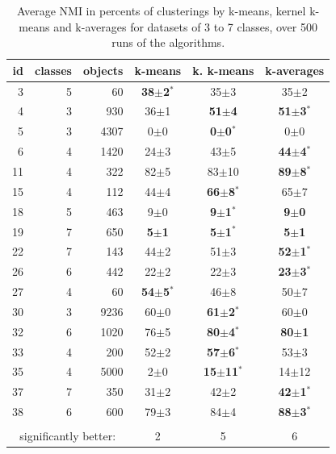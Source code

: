 \documentclass[10pt,journal,compsoc]{IEEEtran}
\begin{document}
   
\begin{table} 
\begin{center} 
\caption{Average NMI in percents of clusterings by k-means, kernel k-means and k-averages for datasets of 3 to 7 classes, over 500 runs of the algorithms.}
\label{tab:results-37}
\begin{tabular}{rrrccc} 
id & classes & objects & k-means & k. k-means & k-averages \\ 
\hline 
 3 & 5 &   60 & \textbf{38$\pm$2$^*$} & 35$\pm$3 & 35$\pm$2 \\ 
 4 & 3 &  930 & 36$\pm$1 & \textbf{51$\pm$4} & \textbf{51$\pm$3$^*$} \\ 
 5 & 3 & 4307 & 0$\pm$0 & \textbf{0$\pm$0$^*$} & 0$\pm$0 \\ 
 6 & 4 & 1420 & 24$\pm$3 & 43$\pm$5 & \textbf{44$\pm$4$^*$} \\ 
11 & 4 &  322 &  82$\pm$5 & 83$\pm$10 & \textbf{ 89$\pm$8$^*$} \\ 
15 & 4 &  112 & 44$\pm$4 & \textbf{66$\pm$8$^*$} & 65$\pm$7 \\ 
18 & 5 &  463 & 9$\pm$0 & \textbf{9$\pm$1$^*$} & \textbf{9$\pm$0} \\ 
19 & 7 &  650 & \textbf{5$\pm$1} & \textbf{5$\pm$1$^*$} & \textbf{5$\pm$1} \\ 
22 & 7 &  143 & 44$\pm$2 & 51$\pm$3 & \textbf{52$\pm$1$^*$} \\ 
26 & 6 &  442 & 22$\pm$2 & 22$\pm$3 & \textbf{23$\pm$3$^*$} \\ 
27 & 4 &   60 & \textbf{54$\pm$5$^*$} & 46$\pm$8 & 50$\pm$7 \\ 
30 & 3 & 9236 & 60$\pm$0 & \textbf{61$\pm$2$^*$} & 60$\pm$0 \\ 
32 & 6 & 1020 & 76$\pm$5 & \textbf{80$\pm$4$^*$} & \textbf{80$\pm$1} \\ 
33 & 4 &  200 & 52$\pm$2 & \textbf{57$\pm$6$^*$} & 53$\pm$3 \\ 
35 & 4 & 5000 &   2$\pm$0 & \textbf{15$\pm$11$^*$} & 14$\pm$12 \\ 
37 & 7 &  350 & 31$\pm$2 & 42$\pm$2 & \textbf{42$\pm$1$^*$} \\ 
38 & 6 &  600 & 79$\pm$3 & 84$\pm$4 & \textbf{88$\pm$3$^*$} \\ 
\hline 
\vspace{-.2cm} \\
\multicolumn{3}{c}{significantly better:}  & 2 & 5 & 6 \\ 
\end{tabular} 
\end{center} 
\end{table} 
 
\end{document}
